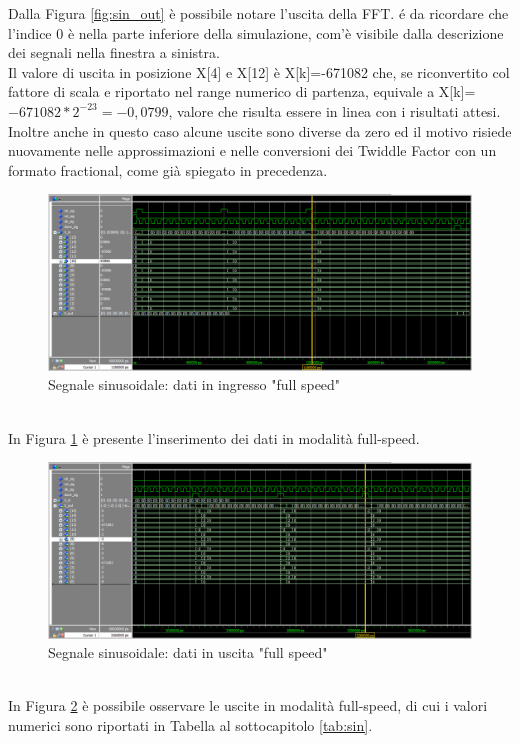 \documentclass[a4paper, titlepage]{article}
\begin{document}
Dalla Figura \ref{fig:sin_out} è possibile notare l'uscita della FFT. é da ricordare che l'indice 0 è nella parte inferiore della simulazione, com'è visibile dalla descrizione dei segnali nella finestra a sinistra.\\
Il valore di uscita in posizione X[4] e X[12] è X[k]=-671082 che, se riconvertito col fattore di scala e riportato nel range numerico di partenza, equivale a X[k]=$-671082*2^{-23}=-0,0799$, valore che risulta essere in linea con i risultati attesi. Inoltre anche in questo caso alcune uscite sono diverse da zero ed il motivo risiede nuovamente nelle approssimazioni e nelle conversioni dei Twiddle Factor con un formato fractional, come già spiegato in precedenza.
\begin{figure}[h]
    \centering
    \includegraphics[scale=0.45]{test_sin/fs_sin_in_doble.png}
    \caption{Segnale sinusoidale: dati in ingresso "full speed"}
    \label{fig:sin_insin_in_doble}
\end{figure}\\
In Figura \ref{fig:sin_insin_in_doble} è presente l'inserimento dei dati in modalità full-speed.
\pagebreak
\begin{figure}[h]
    \centering
    \includegraphics[scale=0.45]{test_sin/fs_sin_out_doble.png}
    \caption{Segnale sinusoidale: dati in uscita "full speed"}
    \label{fig:sin_out_doble}
\end{figure}\\
In Figura \ref{fig:sin_out_doble} è possibile osservare le uscite in modalità full-speed, di cui i valori numerici sono riportati in Tabella al sottocapitolo \ref{tab:sin}.
\end{document}
